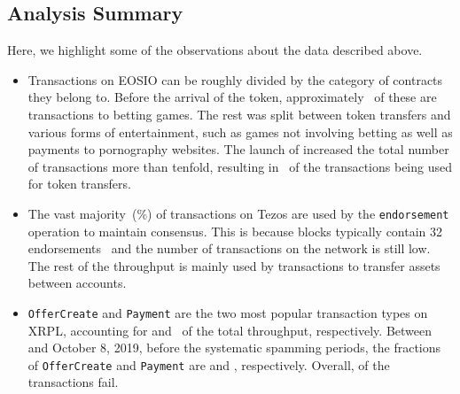 \subsection{Analysis Summary}
Here, we highlight some of the observations about the data described above.
\begin{itemize}\itemsep=0pt
    \item Transactions on EOSIO can be roughly divided by the category of contracts they belong to.
          Before the arrival of the  token, approximately~ of these are transactions to betting games. The rest was split between token transfers and various forms of entertainment, such as games not involving betting as well as payments to pornography websites. The launch of  increased the total number of transactions more than tenfold, resulting in~ of the transactions being used for token transfers.

    \item The vast majority~(\%) of transactions on Tezos are used by the \texttt{endorsement} operation to maintain consensus. This is because blocks typically contain 32 endorsements~\cite{Tezos2018} and the number of transactions on the network is still low. The rest of the throughput is mainly used by transactions to transfer assets between accounts.

    \item \texttt{OfferCreate} and \texttt{Payment} are the two most popular transaction types on XRPL, accounting for  and~ of the total throughput, respectively. Between \startdate and October 8, 2019, before the systematic spamming periods, the fractions of \texttt{OfferCreate} and \texttt{Payment} are  and , respectively. Overall,  of the transactions fail.
\end{itemize}
